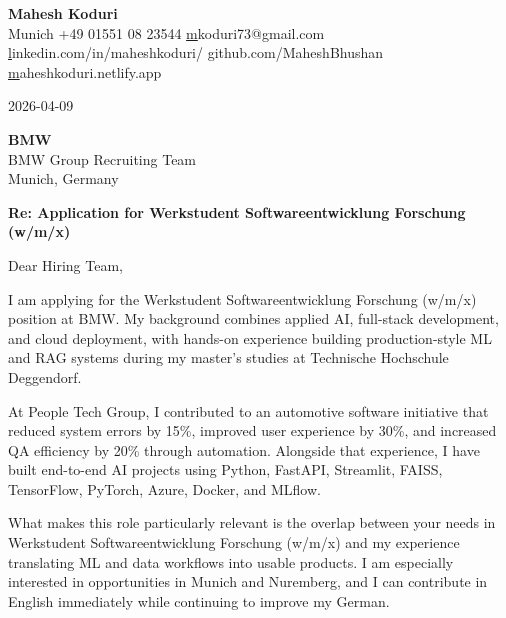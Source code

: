 \documentclass[11pt,a4paper]{letter}
\begin{document}
\begin{center}
    {\LARGE \textbf{ Mahesh Koduri }}\\[0.3cm]
     Munich \quad
     +49 01551 08 23544 \quad
     \href{mailto:mkoduri73@gmail.com}mkoduri73@gmail.com\\[0.2cm]
     \href{https://linkedin.com/in/maheshkoduri/}linkedin.com/in/maheshkoduri/ \quad
     \href{https://github.com/MaheshBhushan}github.com/MaheshBhushan \quad
     \href{https://maheshkoduri.netlify.app}maheshkoduri.netlify.app
\end{center}

\vspace{0.5cm}

2026-04-09

\vspace{0.5cm}

\textbf{ BMW }\\
BMW Group Recruiting Team\\
Munich, Germany

\vspace{0.5cm}

\textbf{Re: Application for Werkstudent Softwareentwicklung Forschung (w/m/x)}

\vspace{0.5cm}

Dear Hiring Team,

I am applying for the Werkstudent Softwareentwicklung Forschung (w/m/x) position at BMW. My background combines applied AI, full-stack development, and cloud deployment, with hands-on experience building production-style ML and RAG systems during my master's studies at Technische Hochschule Deggendorf.

At People Tech Group, I contributed to an automotive software initiative that reduced system errors by 15\%, improved user experience by 30\%, and increased QA efficiency by 20\% through automation. Alongside that experience, I have built end-to-end AI projects using Python, FastAPI, Streamlit, FAISS, TensorFlow, PyTorch, Azure, Docker, and MLflow.

What makes this role particularly relevant is the overlap between your needs in Werkstudent Softwareentwicklung Forschung (w/m/x) and my experience translating ML and data workflows into usable products. I am especially interested in opportunities in Munich and Nuremberg, and I can contribute in English immediately while continuing to improve my German.
\end{document}
